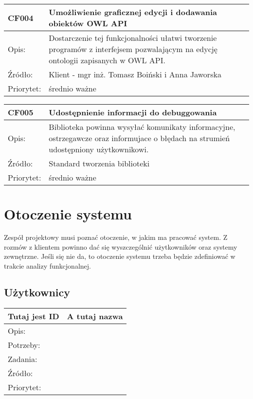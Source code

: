 \documentclass[a4paper,10pt]{article}
\begin{document}
\begin{center}
\begin{tabular}{|l|l|} \hline

CF004 & Umożliwienie graficznej edycji i dodawania obiektów OWL API \\ \hline
Opis: &  Dostarczenie tej funkcjonalności ułatwi tworzenie programów z interfejsem pozwalającym na edycję ontologii zapisanych w OWL API. \\ \hline
Źródło: & Klient - mgr inż. Tomasz Boiński i Anna Jaworska \\ \hline
Priorytet: & średnio ważne \\ \hline

\end{tabular}
\end{center}


\begin{center}
\begin{tabular}{|l|l|} \hline

CF005 & Udostępnienie informacji do debuggowania  \\ \hline
Opis: &  Biblioteka powinna wysyłać komunikaty informacyjne, ostrzegawcze oraz informujace o błędach na strumień udostępniony użytkownikowi.  \\ \hline
Źródło: & Standard tworzenia biblioteki \cite{artOstandardach} \\ \hline
Priorytet: & średnio ważne \\ \hline

\end{tabular}
\end{center}


\section{Otoczenie systemu}

Zespół projektowy musi poznać otoczenie, w jakim ma pracować system. Z rozmów z klientem powinno dać się wyszczególnić użytkowników oraz systemy zewnętrzne. Jeśli się nie da, to otoczenie systemu trzeba będzie zdefiniować w trakcie analizy funkcjonalnej.

\subsection{Użytkownicy}

\begin{center}
\begin{tabular}{|l|l|} \hline

Tutaj jest ID & A tutaj nazwa \\ \hline
Opis: &  \\ \hline
Potrzeby: &  \\ \hline
Zadania: &  \\ \hline
Źródło: &  \\ \hline
Priorytet: &  \\ \hline

\end{tabular}
\end{center}
\end{document}
